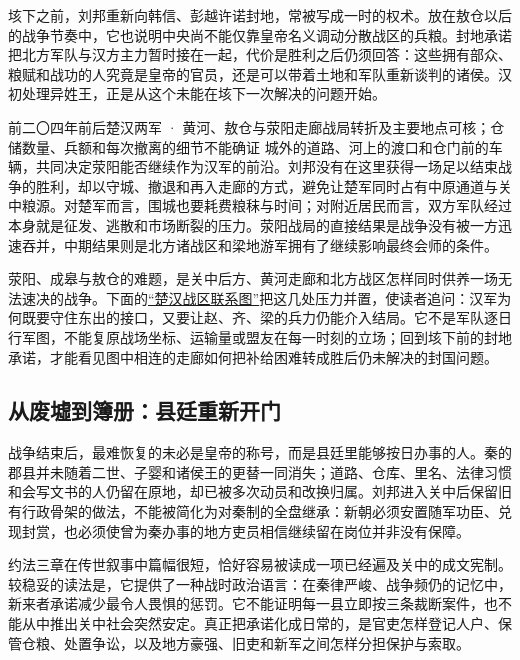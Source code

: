 垓下之前，刘邦重新向韩信、彭越许诺封地，常被写成一时的权术。放在敖仓以后的战争节奏中，它也说明中央尚不能仅靠皇帝名义调动分散战区的兵粮。封地承诺把北方军队与汉方主力暂时接在一起，代价是胜利之后仍须回答：这些拥有部众、粮赋和战功的人究竟是皇帝的官员，还是可以带着土地和军队重新谈判的诸侯。汉初处理异姓王，正是从这个未能在垓下一次解决的问题开始。

\begin{event}{}{前二〇四年前后}{楚汉两军 · 黄河、敖仓与荥阳走廊}{战局转折及主要地点可核；仓储数量、兵额和每次撤离的细节不能确证}
城外的道路、河上的渡口和仓门前的车辆，共同决定荥阳能否继续作为汉军的前沿。刘邦没有在这里获得一场足以结束战争的胜利，却以守城、撤退和再入走廊的方式，避免让楚军同时占有中原通道与关中粮源。对楚军而言，围城也要耗费粮秣与时间；对附近居民而言，双方军队经过本身就是征发、逃散和市场断裂的压力。荥阳战局的直接结果是战争没有被一方迅速吞并，中期结果则是北方诸战区和梁地游军拥有了继续影响最终会师的条件。
\end{event}

荥阳、成皋与敖仓的难题，是关中后方、黄河走廊和北方战区怎样同时供养一场无法速决的战争。下面的\hyperref[fig:chu-han-corridors]{“楚汉战区联系图”}把这几处压力并置，使读者追问：汉军为何既要守住东出的接口，又要让赵、齐、梁的兵力仍能介入结局。它不是军队逐日行军图，不能复原战场坐标、运输量或盟友在每一时刻的立场；回到垓下前的封地承诺，才能看见图中相连的走廊如何把补给困难转成胜后仍未解决的封国问题。


\subsection{从废墟到簿册：县廷重新开门}

战争结束后，最难恢复的未必是皇帝的称号，而是县廷里能够按日办事的人。秦的郡县并未随着二世、子婴和诸侯王的更替一同消失；道路、仓库、里名、法律习惯和会写文书的人仍留在原地，却已被多次动员和改换归属。刘邦进入关中后保留旧有行政骨架的做法，不能被简化为对秦制的全盘继承：新朝必须安置随军功臣、兑现封赏，也必须使曾为秦办事的地方吏员相信继续留在岗位并非没有保障。

约法三章在传世叙事中篇幅很短，恰好容易被读成一项已经遍及关中的成文宪制。较稳妥的读法是，它提供了一种战时政治语言：在秦律严峻、战争频仍的记忆中，新来者承诺减少最令人畏惧的惩罚。它不能证明每一县立即按三条裁断案件，也不能从中推出关中社会突然安定。真正把承诺化成日常的，是官吏怎样登记人户、保管仓粮、处置争讼，以及地方豪强、旧吏和新军之间怎样分担保护与索取。

